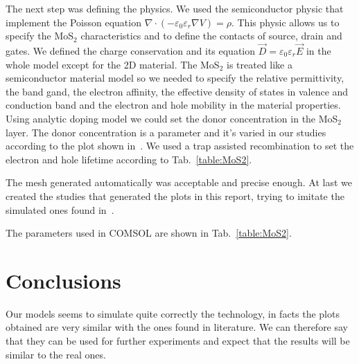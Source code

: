 \documentclass[electronics,article,submit,moreauthors,pdftex]{Definitions/mdpi}
\begin{document}
The next step was defining the physics. We used the semiconductor physic that implement the Poisson equation $\nabla \cdot (-\varepsilon_0 \varepsilon_r \nabla V) = \rho$. This physic allows us to specify the MoS$_2$ characteristics and to define the contacts of source, drain and gates. We defined the charge conservation and its equation $\vec{D} = \varepsilon_0 \varepsilon_r \vec{E}$ in the whole model except for the 2D material. The MoS$_2$ is treated like a semiconductor material model so we needed to specify the relative permittivity, the band gand, the electron affinity, the effective density of states in valence and conduction band and the electron and hole mobility in the material properties. Using analytic doping model we could set the donor concentration in the MoS$_2$ layer. The donor concentration is a parameter and it's varied in our studies according to the plot shown in~\cite{Howell:MonolayerMultiLayer_MoS2}. We used a trap assisted recombination to set the electron and hole lifetime according to Tab.~\ref{table:MoS2}. 

The mesh generated automatically was acceptable and precise enough. At last we created the studies that generated the plots in this report, trying to imitate the simulated ones found in~\cite{Howell:MonolayerMultiLayer_MoS2}. 

The parameters used in COMSOL are shown in Tab.~\ref{table:MoS2}.

\section{Conclusions}

Our models seems to simulate quite correctly the technology, in facts the plots obtained are very similar with the ones found in literature.
We can therefore say that they can be used for further experiments and expect that the results will be similar to the real ones.


\end{document}
